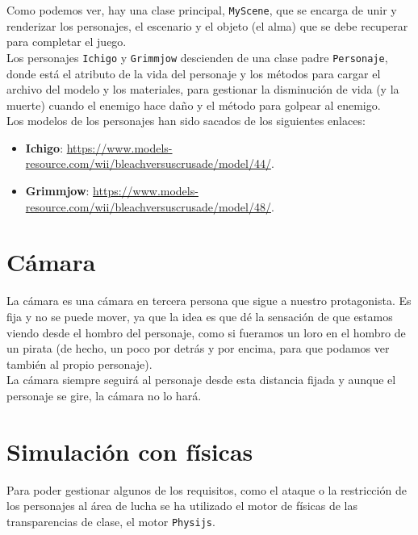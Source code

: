 \documentclass[11pt,a4paper]{article}
\begin{document}
Como podemos ver, hay una clase principal, \texttt{MyScene}, que se encarga de unir y renderizar los personajes, el escenario y el objeto (el alma) que se debe recuperar para completar el juego.\\

Los personajes \texttt{Ichigo} y \texttt{Grimmjow} descienden de una clase padre \texttt{Personaje}, donde está el atributo de la vida del personaje y los métodos para cargar el archivo del modelo y los materiales, para gestionar la disminución de vida (y la muerte) cuando el enemigo hace daño y el método para golpear al enemigo.\\

Los modelos de los personajes han sido sacados de los siguientes enlaces:

\begin{itemize}
	\item \textbf{Ichigo}: \color{blue}\url{https://www.models-resource.com/wii/bleachversuscrusade/model/44/}\color{black}.
	\item \textbf{Grimmjow}: \color{blue}\url{https://www.models-resource.com/wii/bleachversuscrusade/model/48/}\color{black}.
\end{itemize}

\section{Cámara}

La cámara es una cámara en tercera persona que sigue a nuestro protagonista. Es fija y no se puede mover, ya que la idea es que dé la sensación de que estamos viendo desde el hombro del personaje, como si fueramos un loro en el hombro de un pirata (de hecho, un poco por detrás y por encima, para que podamos ver también al propio personaje).\\

La cámara siempre seguirá al personaje desde esta distancia fijada y aunque el personaje se gire, la cámara no lo hará.  

\section{Simulación con físicas}

Para poder gestionar algunos de los requisitos, como el ataque o la restricción de los personajes al área de lucha se ha utilizado el motor de físicas de las transparencias de clase, el motor \texttt{Physijs}.\\
\end{document}
